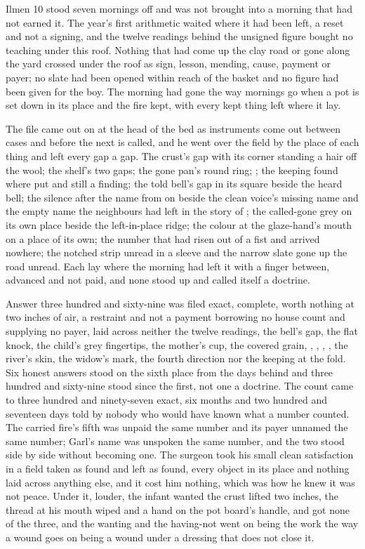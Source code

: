 Ilmen 10 stood seven mornings off and was not brought into a morning that had not earned it. The year's first arithmetic waited where it had been left, a reset and not a signing, and the twelve readings behind the unsigned figure bought no teaching under this roof. Nothing that had come up the clay road or gone along the yard crossed under the roof as sign, lesson, mending, cause, payment or payer; no slate had been opened within reach of the basket and no figure had been given for the boy. The morning had gone the way mornings go when a pot is set down in its place and the fire kept, with every kept thing left where it lay.

The file came out on  at the head of the bed as instruments come out between cases and before the next is called, and he went over the field by the place of each thing and left every gap a gap. The crust's gap with its corner standing a hair off the wool; the shelf's two gaps; the gone pan's round ring; ; the keeping found where put and still a finding; the told bell's gap in its square beside the heard bell; the silence after the name from  on  beside the clean voice's missing name and the empty name the neighbours had left in the story of ; the called-gone grey on its own place beside the left-in-place ridge; the colour at the glaze-hand's mouth on a place of its own; the number that had risen out of a fist and arrived nowhere; the notched strip unread in a sleeve and the narrow slate gone up the road unread. Each lay where the morning had left it with a finger between, advanced and not paid, and none stood up and called itself a doctrine.

Answer three hundred and sixty-nine was filed exact, complete, worth nothing at two inches of air, a restraint and not a payment borrowing no house count and supplying no payer, laid across neither the twelve readings, the bell's gap, the flat knock, the child's grey fingertips, the mother's cup, the covered grain, , , , , the river's skin, the widow's mark, the fourth direction nor the keeping at the fold. Six honest answers stood on the sixth place from the days behind and three hundred and sixty-nine stood since the first, not one a doctrine. The count came to three hundred and ninety-seven exact, six months and two hundred and seventeen days told by nobody who would have known what a number counted. The carried fire's fifth was unpaid the same number and its payer unnamed the same number; Garl's name was unspoken the same number, and the two stood side by side without becoming one. The surgeon took his small clean satisfaction in a field taken as found and left as found, every object in its place and nothing laid across anything else, and it cost him nothing, which was how he knew it was not peace. Under it, louder, the infant wanted the crust lifted two inches, the thread at his mouth wiped and a hand on the pot board's handle, and got none of the three, and the wanting and the having-not went on being the work the way a wound goes on being a wound under a dressing that does not close it.

